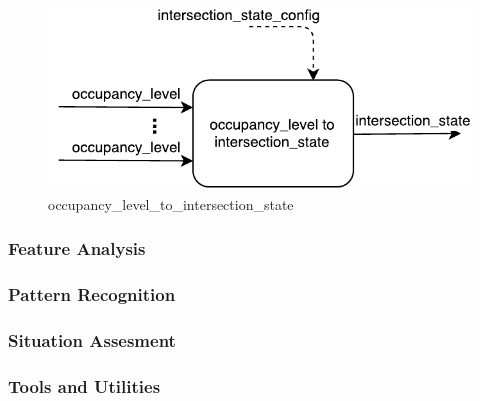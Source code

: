 \begin{description}
\begin{figure}[ht!]
\centering
\includegraphics[scale=0.7]{fig/3/occupancy_level2int_state.pdf}
\caption{occupancy\_level\_to\_intersection\_state}
\label{occupancy_level2int_state}
\end{figure}

\end{description}



\subsubsection{Feature Analysis}
\subsubsection{Pattern Recognition}
\subsubsection{Situation Assesment}
\subsubsection{Tools and Utilities}